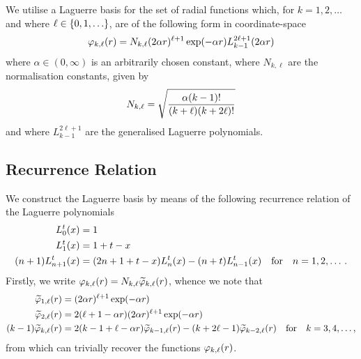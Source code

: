 \documentclass[]{article}
\begin{document}
We utilise a Laguerre basis for the set of radial functions which,
for $k = 1, 2, \dotsc$ and where $\ell \in \lrset{0, 1, \dotsc}$, are of the
following form in coordinate-space
\begin{equation*}
  \varphi_{k, \ell}\lr{r}
  =
  N_{k, \ell}
  \lr
  {
    2
    \alpha
    r
  }^{\ell + 1}
  \exponential\lr
  {
    -
    \alpha
    r
  }
  L_{k - 1}^{2 \ell + 1}\lr{2 \alpha r}
\end{equation*}
where $\alpha \in (0, \infty)$ is an arbitrarily chosen constant,
where $N_{k, \ell}$ are the normalisation constants, given by
\begin{equation*}
  N_{k, \ell}
  =
  \sqrt
  {
    \dfrac
    {
      \alpha
      (k - 1)!
    }
    {
      (k + \ell)
      (k + 2 \ell)!
    }
  }
\end{equation*}
and where $L_{k - 1}^{2 \ell + 1}$ are the generalised Laguerre polynomials.

\subsection{Recurrence Relation}
\label{sec:recurrence-relation}

We construct the Laguerre basis by means of the following recurrence relation of
the Laguerre polynomials
\begin{alignat*}{2}
  L_{0}^{t}\lr{x}
  {}={}
  &
  1
  \\
  L_{1}^{t}\lr{x}
  {}={}
  &
  1
  +
  t
  -
  x
  \\
  \lr{n + 1}
  L_{n + 1}^{t}\lr{x}
  {}={}
  &
  \lr
  {
    2
    n
    +
    1
    +
    t
    -
    x
  }
  L_{n}^{t}\lr{x}
  -
  \lr{n + t}
  L_{n - 1}^{t}\lr{x}
  \qq{for}
  n = 1, 2, \dotsc.
\end{alignat*}
Firstly, we write
$\varphi_{k, \ell}(r) = N_{k, \ell}\widetilde{\varphi}_{k, \ell}(r)$,
whence we note that
\begin{alignat*}{2}
  \widetilde{\varphi}_{1, \ell}\lr{r}
  {}={}
  &
  \lr
  {
    2
    \alpha
    r
  }^{\ell + 1}
  \exponential\lr
  {
    -
    \alpha
    r
  }
  \\
  \widetilde{\varphi}_{2, \ell}\lr{r}
  {}={}
  &
  2
  \lr
  {
    \ell
    +
    1
    -
    \alpha
    r
  }
  \lr
  {
    2
    \alpha
    r
  }^{\ell + 1}
  \exponential\lr
  {
    -
    \alpha
    r
  }
  \\
  \lr{k - 1}
  \widetilde{\varphi}_{k, \ell}\lr{r}
  {}={}
  &
  2
  \lr
  {
    k
    -
    1
    +
    \ell
    -
    \alpha
    r
  }
  \widetilde{\varphi}_{k - 1, \ell}\lr{r}
  -
  \lr
  {
    k
    +
    2
    \ell
    -
    1
  }
  \widetilde{\varphi}_{k - 2, \ell}\lr{r}
  \qq{for}
  k = 3, 4, \dotsc,
\end{alignat*}
from which can trivially recover the functions $\varphi_{k, \ell}(r)$.
\end{document}
